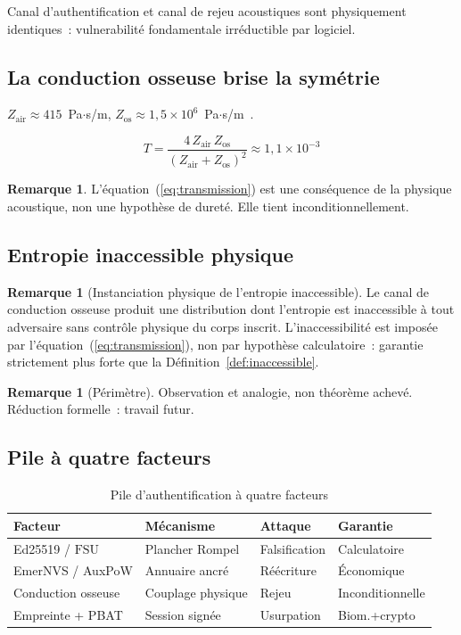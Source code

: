 \documentclass[11pt,a4paper]{article}
\theoremstyle{definition}
\newtheorem{remark}[theorem]{Remarque}
\newcommand{\OWF}{\mathrm{FSU}}
\newcommand{\PBAT}{\textsf{PBAT}}
\begin{document}
Canal d'authentification et canal de rejeu acoustiques sont
physiquement identiques~: vulnerabilité fondamentale irréductible
par logiciel.

\subsection{La conduction osseuse brise la symétrie}
\label{sec:impedance}

$Z_\text{air} \approx 415$~Pa$\cdot$s/m,
$Z_\text{os} \approx 1{,}5 \times 10^6$~Pa$\cdot$s/m~\cite{Acoustics}.

\begin{equation}
\label{eq:transmission}
T = \frac{4\, Z_\text{air}\, Z_\text{os}}{(Z_\text{air}+Z_\text{os})^2}
\approx 1{,}1 \times 10^{-3}
\end{equation}

\begin{remark}
L'équation~(\ref{eq:transmission}) est une conséquence de la physique
acoustique, non une hypothèse de dureté. Elle tient inconditionnellement.
\end{remark}

\subsection{Entropie inaccessible physique}

\begin{remark}[Instanciation physique de l'entropie inaccessible]
\label{rem:physical_ie}
Le canal de conduction osseuse produit une distribution dont l'entropie
est inaccessible à tout adversaire sans contrôle physique du corps
inscrit. L'inaccessibilité est imposée par
l'équation~(\ref{eq:transmission}), non par hypothèse calculatoire~:
garantie strictement plus forte que la Définition~\ref{def:inaccessible}.
\end{remark}

\begin{remark}[Périmètre]
Observation et analogie, non théorème achevé. Réduction formelle~:
travail futur.
\end{remark}

\subsection{Pile à quatre facteurs}

\begin{table}[h]
\centering
\caption{Pile d'authentification à quatre facteurs}
\label{tab:fourfactor}
\begin{tabular}{llll}
\toprule
Facteur & Mécanisme & Attaque & Garantie \\
\midrule
Ed25519 / $\OWF$ & Plancher Rompel & Falsification & Calculatoire \\
EmerNVS / AuxPoW & Annuaire ancré & Réécriture & Économique \\
Conduction osseuse & Couplage physique & Rejeu & Inconditionnelle \\
Empreinte + \PBAT{} & Session signée & Usurpation & Biom.+crypto \\
\bottomrule
\end{tabular}
\end{table}
\end{document}
